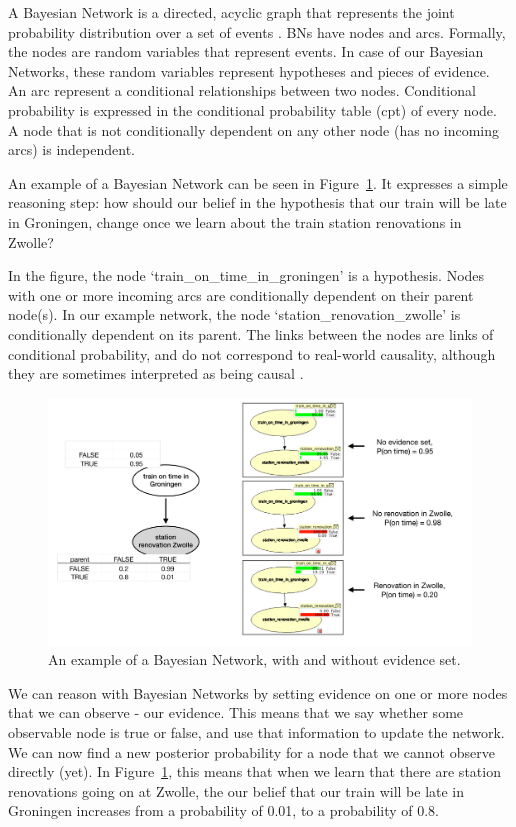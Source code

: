 A Bayesian Network is a directed, acyclic graph that represents the joint probability distribution over a set of events \citep{pearl1988}. BNs have nodes and arcs. Formally, the nodes are random variables that represent events. In case of our Bayesian Networks, these random variables represent hypotheses and pieces of evidence. An arc represent a conditional relationships between two nodes. Conditional probability is expressed in the conditional probability table (cpt) of every node. A node that is not conditionally dependent on any other node (has no incoming arcs) is independent. 

 An example of a Bayesian Network can be seen in Figure~\ref{exampleBN}. It expresses a simple reasoning step: how should our belief in the hypothesis that our train will be late in Groningen, change once we learn about the train station renovations in Zwolle?
 
In the figure, the node `train\_on\_time\_in\_groningen' is a hypothesis. Nodes with one or more incoming arcs are conditionally dependent on their parent node(s). In our example network, the node `station\_renovation\_zwolle' is conditionally dependent on its parent. The links between the nodes are links of conditional probability, and do not correspond to real-world causality, although they are sometimes interpreted as being causal \citep{Dawid2008}.

\begin{figure}[h]
\includegraphics[width=\linewidth]{images/bnExample.pdf}
\caption{An example of a Bayesian Network, with and without evidence set.}
\label{exampleBN}
\end{figure}

We can reason with Bayesian Networks by setting evidence on one or more nodes that we can observe - our evidence. This means that we say whether some observable node is true or false, and use that information to update the network. We can now find a new posterior probability for a node that we cannot observe directly (yet). In Figure~\ref{exampleBN}, this means that when we learn that there are station renovations going on at Zwolle, the our belief that our train will be late in Groningen increases from a probability of 0.01, to a probability of 0.8. 


